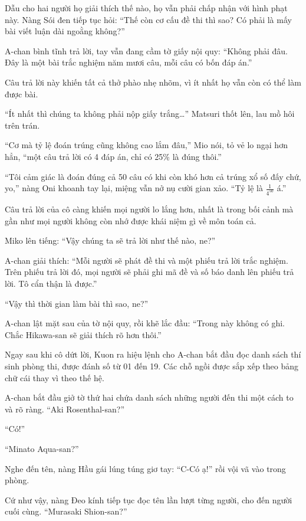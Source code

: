 \documentclass[../main.tex]{subfiles}
\begin{document}
Dẫu cho hai người họ giải thích thế nào, họ vẫn phải chấp nhận với hình phạt này. Nàng Sói đen tiếp tục hỏi: ``Thế còn cơ cấu đề thi thì sao? Có phải là mấy bài viết luận dài ngoằng không?''

A-chan bình tĩnh trả lời, tay vẫn đang cầm tờ giấy nội quy: ``Không phải đâu. Đây là một bài trắc nghiệm năm mươi câu, mỗi câu có bốn đáp án.''

Câu trả lời này khiến tất cả thở phào nhẹ nhõm, vì ít nhất họ vẫn còn có thể làm được bài.

``Ít nhất thì chúng ta không phải nộp giấy trắng\dots'' Matsuri thốt lên, lau mồ hôi trên trán.

``Cơ mà tỷ lệ đoán trúng cũng không cao lắm đâu,'' Mio nói, tỏ vẻ lo ngại hơn hẳn, ``một câu trả lời có 4 đáp án, chỉ có 25\% là đúng thôi.''

``Tôi cảm giác là đoán đúng cả 50 câu có khi còn khó hơn cả trúng xổ số đấy chứ, yo,'' nàng Oni khoanh tay lại, miệng vẫn nở nụ cười gian xảo. ``Tỷ lệ là \(\frac{1}{4^{50}}\) á.''

Câu trả lời của cô càng khiến mọi người lo lắng hơn, nhất là trong bối cảnh mà gần như mọi người không còn nhớ được khái niệm gì về môn toán cả.

Miko lên tiếng: ``Vậy chúng ta sẽ trả lời như thế nào, ne?''

A-chan giải thích: ``Mỗi người sẽ phát đề thi và một phiếu trả lời trắc nghiệm. Trên phiếu trả lời đó, mọi người sẽ phải ghi mã đề và số báo danh lên phiếu trả lời. Tô cẩn thận là được.''

``Vậy thì thời gian làm bài thì sao, ne?''

A-chan lật mặt sau của tờ nội quy, rồi khẽ lắc đầu: ``Trong này không có ghi. Chắc Hikawa-san sẽ giải thích rõ hơn thôi.''

Ngay sau khi cô dứt lời, Kuon ra hiệu lệnh cho A-chan bắt đầu đọc danh sách thí sinh phòng thi, được đánh số từ 01 đến 19. Các chỗ ngồi được sắp xếp theo bảng chữ cái thay vì theo thế hệ.

A-chan bắt đầu giở tờ thứ hai chứa danh sách những người đến thi một cách to và rõ ràng. ``Aki Rosenthal-san?''

``Có!''

``Minato Aqua-san?''

Nghe đến tên, nàng Hầu gái lúng túng giơ tay: ``C-Có ạ!'' rồi vội vã vào trong phòng.

Cứ như vậy, nàng Đeo kính tiếp tục đọc tên lần lượt từng người, cho đến người cuối cùng. ``Murasaki Shion-san?''
\end{document}
